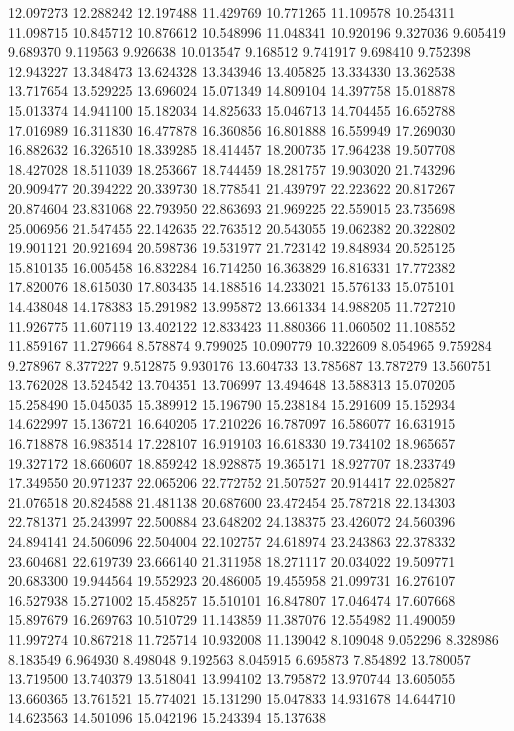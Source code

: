 12.097273
12.288242
12.197488
11.429769
10.771265
11.109578
10.254311
11.098715
10.845712
10.876612
10.548996
11.048341
10.920196
9.327036
9.605419
9.689370
9.119563
9.926638
10.013547
9.168512
9.741917
9.698410
9.752398
12.943227
13.348473
13.624328
13.343946
13.405825
13.334330
13.362538
13.717654
13.529225
13.696024
15.071349
14.809104
14.397758
15.018878
15.013374
14.941100
15.182034
14.825633
15.046713
14.704455
16.652788
17.016989
16.311830
16.477878
16.360856
16.801888
16.559949
17.269030
16.882632
16.326510
18.339285
18.414457
18.200735
17.964238
19.507708
18.427028
18.511039
18.253667
18.744459
18.281757
19.903020
21.743296
20.909477
20.394222
20.339730
18.778541
21.439797
22.223622
20.817267
20.874604
23.831068
22.793950
22.863693
21.969225
22.559015
23.735698
25.006956
21.547455
22.142635
22.763512
20.543055
19.062382
20.322802
19.901121
20.921694
20.598736
19.531977
21.723142
19.848934
20.525125
15.810135
16.005458
16.832284
16.714250
16.363829
16.816331
17.772382
17.820076
18.615030
17.803435
14.188516
14.233021
15.576133
15.075101
14.438048
14.178383
15.291982
13.995872
13.661334
14.988205
11.727210
11.926775
11.607119
13.402122
12.833423
11.880366
11.060502
11.108552
11.859167
11.279664
8.578874
9.799025
10.090779
10.322609
8.054965
9.759284
9.278967
8.377227
9.512875
9.930176
13.604733
13.785687
13.787279
13.560751
13.762028
13.524542
13.704351
13.706997
13.494648
13.588313
15.070205
15.258490
15.045035
15.389912
15.196790
15.238184
15.291609
15.152934
14.622997
15.136721
16.640205
17.210226
16.787097
16.586077
16.631915
16.718878
16.983514
17.228107
16.919103
16.618330
19.734102
18.965657
19.327172
18.660607
18.859242
18.928875
19.365171
18.927707
18.233749
17.349550
20.971237
22.065206
22.772752
21.507527
20.914417
22.025827
21.076518
20.824588
21.481138
20.687600
23.472454
25.787218
22.134303
22.781371
25.243997
22.500884
23.648202
24.138375
23.426072
24.560396
24.894141
24.506096
22.504004
22.102757
24.618974
23.243863
22.378332
23.604681
22.619739
23.666140
21.311958
18.271117
20.034022
19.509771
20.683300
19.944564
19.552923
20.486005
19.455958
21.099731
16.276107
16.527938
15.271002
15.458257
15.510101
16.847807
17.046474
17.607668
15.897679
16.269763
10.510729
11.143859
11.387076
12.554982
11.490059
11.997274
10.867218
11.725714
10.932008
11.139042
8.109048
9.052296
8.328986
8.183549
6.964930
8.498048
9.192563
8.045915
6.695873
7.854892
13.780057
13.719500
13.740379
13.518041
13.994102
13.795872
13.970744
13.605055
13.660365
13.761521
15.774021
15.131290
15.047833
14.931678
14.644710
14.623563
14.501096
15.042196
15.243394
15.137638
